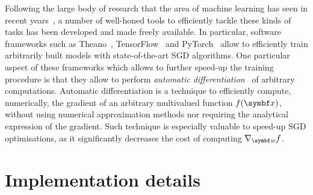 Following the large body of research that the area of machine learning has seen in recent years~\cite{lecun2015deep,silver2016mastering}, a number of well-honed tools to efficiently tackle these kinds of tasks has been developed and made freely available.
In particular, software frameworks such as Theano~\cite{team2016theano}, TensorFlow~\cite{tensorflow2015-whitepaper} and PyTorch~\cite{paszke2017automatic} allow to efficiently train arbitrarily built models with state-of-the-art \ac{SGD} algorithms.
One particular aspect of these frameworks which allows to further speed-up the training procedure is that they allow to perform \emph{automatic differentiation}~\cite{wengert1964a,bartholomewbiggs2000automatic,baydin2015automatic} of arbitrary computations.
Automatic differentiation is a technique to efficiently compute, numerically, the gradient of an arbitrary multivalued function $f(\bs x)$, without using numerical approximation methods nor requiring the analytical expression of the gradient.
Such technique is especially valuable to speed-up \ac{SGD} optimisations, as it significantly decreases the cost of computing $\grad_\bsw f$.

\section{Implementation details}
\label{details}

